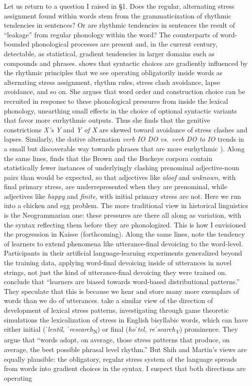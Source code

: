 \documentclass[output=paper,
modfonts
]{LSP/langsci}
\begin{document}
Let us return to a question I raised in §1. Does the regular, alternating stress assignment found within words stem from the grammaticization of rhythmic tendencies in sentences? Or are rhythmic tendencies in sentences the result of “leakage” from regular phonology within the word? The counterparts of word-bounded phonological processes are present and, in the current century, detectable, as statistical, gradient tendencies in larger domains such as compounds and phrases. \citet{shih2016} shows that syntactic choices are gradiently influenced by the rhythmic principles that we see operating obligatorily inside words as alternating stress assignment, rhythm rules, stress clash avoidance, lapse avoidance, and so on. She argues that word order and construction choice can be recruited in response to these phonological pressures from inside the lexical phonology, unearthing small effects in the choice of optional syntactic variants that favor more eurhythmic outputs. Thus she finds that the genitive constrictions \textit{X’s Y} and\textit{ Y of X} are skewed toward avoidance of stress clashes and lapses. Similarly, the dative alternation \textit{verb IO DO vs.\ verb DO to IO} trends in a small but discoverable way towards phrases that are more eurhythmic \citep{anttila2010,shih2016}). Along the same lines, \citet{hammond2013} finds that the Brown and the Buckeye corpora contain statistically fewer instances of underlyingly clashing prenominal adjective-noun pairs than would be expected, so that adjectives like \textit{aloof} and \textit{unknown,} with final primary stress, are underrepresented when they are prenominal,\textit{} while adjectives like \textit{happy} and \textit{finite,} with initial primary stress are not. Here we run into a chicken and egg problem. The more traditional view in historical linguistics is the Neogrammarian one: these pressures are there all along as variation, with the syntax reflecting them before they are phonologized. This is how I envisioned the progression in Kaisse (forthcoming). Along the same lines, \citet{myers2015} note the tendency of learners to extend phenomena like utterance-final devoicing to the word-level. Participants in their artificial language-learning experiments generalized beyond the training data, applying word-final devoicing inside of utterances in novel strings, not just the kind of utterance-final devoicing they were trained on. \citet[399]{myers2015} conclude that “learners are biased towards word-based distributional patterns.” They speculate that this is because we hear and store many more exemplars of words than we do of utterances. \citet{baumann2012} take a similar view of the direction of development of lexical stress patterns, investigating through game theoretic simulations the lexicalization of stress in English bisyllabic words, which can have either initial (\textit{ˈlentil, ˈresearch}\textsubscript{N}) or final (\textit{hoˈtel, reˈsearch}\textit{\textsubscript{V}}) prominence. They argue that “words adopt, on average, those stress patterns that produce, on average, the best possible phrasal level rhythm.” But Shih and Martin’s views are equally plausible: the obligatory, regular stress system of the language spreads from words into gradient choices in the syntax. I suspect that both directions are operating 
\end{document}
